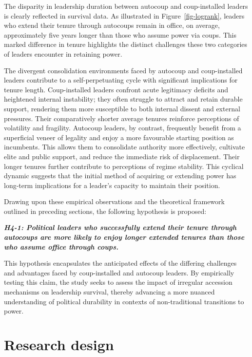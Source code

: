 \documentclass[
  12pt,
]{report}
\begin{document}
The disparity in leadership duration between autocoup and coup-installed
leaders is clearly reflected in survival data. As illustrated in
Figure~\ref{fig-logrank}, leaders who extend their tenure through
autocoups remain in office, on average, approximately five years longer
than those who assume power via coups. This marked difference in tenure
highlights the distinct challenges these two categories of leaders
encounter in retaining power.

The divergent consolidation environments faced by autocoup and
coup-installed leaders contribute to a self-perpetuating cycle with
significant implications for tenure length. Coup-installed leaders
confront acute legitimacy deficits and heightened internal instability;
they often struggle to attract and retain durable support, rendering
them more susceptible to both internal dissent and external pressures.
Their comparatively shorter average tenures reinforce perceptions of
volatility and fragility. Autocoup leaders, by contrast, frequently
benefit from a superficial veneer of legality and enjoy a more
favourable starting position as incumbents. This allows them to
consolidate authority more effectively, cultivate elite and public
support, and reduce the immediate risk of displacement. Their longer
tenures further contribute to perceptions of regime stability. This
cyclical dynamic suggests that the initial method of acquiring or
extending power has long-term implications for a leader's capacity to
maintain their position.

Drawing upon these empirical observations and the theoretical framework
outlined in preceding sections, the following hypothesis is proposed:

\textbf{\emph{H4-1: Political leaders who successfully extend their
tenure through autocoups are more likely to enjoy longer extended
tenures than those who assume office through coups.}}

This hypothesis encapsulates the anticipated effects of the differing
challenges and advantages faced by coup-installed and autocoup leaders.
By empirically testing this claim, the study seeks to assess the impact
of irregular accession mechanisms on leadership survival, thereby
advancing a more nuanced understanding of political durability in
contexts of non-traditional transitions to power.

\section{Research design}\label{research-design-1}
\end{document}
